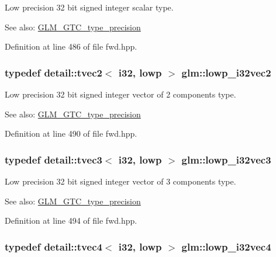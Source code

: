 Low precision 32 bit signed integer scalar type. \begin{Desc}
\item[See also:]\hyperlink{group__gtc__type__precision}{GLM\_\-GTC\_\-type\_\-precision} \end{Desc}


Definition at line 486 of file fwd.hpp.\hypertarget{group__gtc__type__precision_g1ac855a9b4ef24908d00ab715e7ddbff}{
\subsubsection[lowp\_\-i32vec2]{\setlength{\rightskip}{0pt plus 5cm}typedef detail::tvec2$<$ i32, lowp $>$ {\bf glm::lowp\_\-i32vec2}}}
\label{group__gtc__type__precision_g1ac855a9b4ef24908d00ab715e7ddbff}


Low precision 32 bit signed integer vector of 2 components type. \begin{Desc}
\item[See also:]\hyperlink{group__gtc__type__precision}{GLM\_\-GTC\_\-type\_\-precision} \end{Desc}


Definition at line 490 of file fwd.hpp.\hypertarget{group__gtc__type__precision_ga4a0dd64d4253a3641225254670c7b95}{
\subsubsection[lowp\_\-i32vec3]{\setlength{\rightskip}{0pt plus 5cm}typedef detail::tvec3$<$ i32, lowp $>$ {\bf glm::lowp\_\-i32vec3}}}
\label{group__gtc__type__precision_ga4a0dd64d4253a3641225254670c7b95}


Low precision 32 bit signed integer vector of 3 components type. \begin{Desc}
\item[See also:]\hyperlink{group__gtc__type__precision}{GLM\_\-GTC\_\-type\_\-precision} \end{Desc}


Definition at line 494 of file fwd.hpp.\hypertarget{group__gtc__type__precision_g99adefeda08a56345b0553d13283d2fa}{
\subsubsection[lowp\_\-i32vec4]{\setlength{\rightskip}{0pt plus 5cm}typedef detail::tvec4$<$ i32, lowp $>$ {\bf glm::lowp\_\-i32vec4}}}
\label{group__gtc__type__precision_g99adefeda08a56345b0553d13283d2fa}


